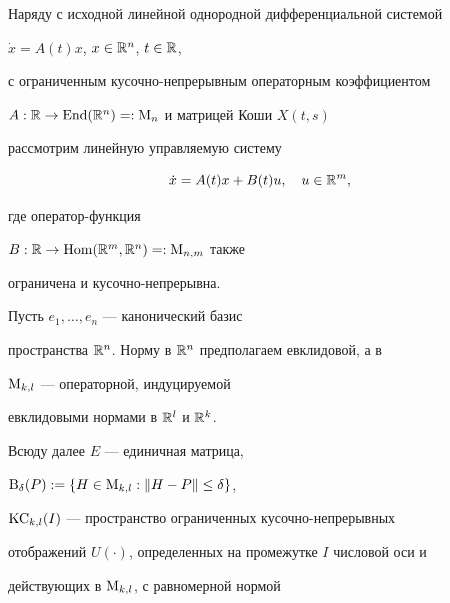 \date{}




\pagestyle{plain} %







\maketitle


\label{begin}








Наряду с исходной линейной однородной дифференциальной системой


$\Dot x=A(t)x$, $x\in\Bbb R^n$, $t\in\Bbb R$,


с ограниченным кусочно-непрерывным операторным коэффициентом


$A:\Bbb R\to\operatorname{End}(\Bbb R^n)=:\mathrm M_n$ и матрицей Коши $X(t,s)$


рассмотрим линейную управляемую систему


\begin{equation}


\Dot x=A(t)x+B(t)u,\quad u\in\Bbb R^m,


\end{equation}


где оператор-функция


$B:\Bbb R\to\operatorname{Hom}(\Bbb R^m,\Bbb R^n)=:\mathrm M_{n,m}$ также


ограничена и кусочно-непрерывна.


Пусть $e_1,\dotsc,e_n$ --- канонический базис


пространства $\Bbb R^n$. Норму в $\Bbb R^n$ предполагаем евклидовой, а в


$\mathrm M_{k,l}$ --- операторной, индуцируемой


евклидовыми нормами в $\Bbb R^l$ и $\Bbb R^k$.


Всюду далее $E$ --- единичная матрица,


$\mathrm B_{\delta}(P):=\{H\in\mathrm M_{k,l}:\|H-P\|\le\delta\}$,


$\mathrm{KC}_{k,l}(I)$ --- пространство ограниченных кусочно-непрерывных


отображений $U(\cdot)$, определенных на промежутке $I$ числовой оси и


действующих в $\mathrm M_{k,l}$, с равномерной нормой


